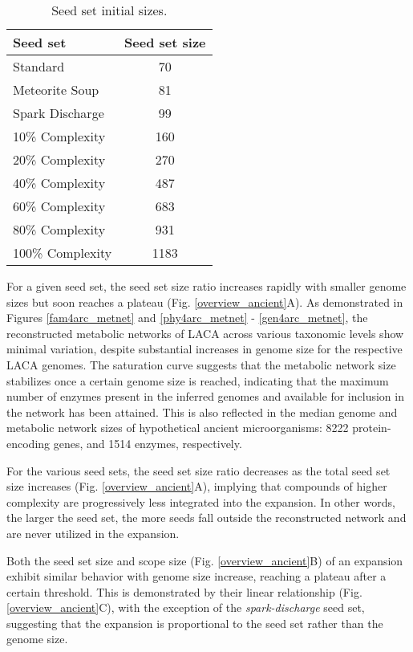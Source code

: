\begin{wraptable}{l}{0.4\textwidth}
    \caption{Seed set initial sizes.}
    \begin{tabular}{lc}

        \textbf{Seed set} & \textbf{Seed set size} \\ \hline\hline
        \addlinespace[0.5ex]
        Standard & 70 \\ 
        Meteorite Soup & 81 \\ 
        Spark Discharge & 99 \\ 
        10\% Complexity & 160 \\ 
        20\% Complexity & 270 \\ 
        40\% Complexity & 487 \\ 
        60\% Complexity & 683 \\ 
        80\% Complexity & 931 \\ 
        100\% Complexity & 1183 \\ 
        \bottomrule
    
    \end{tabular}
    \label{seedset_sizes}
\end{wraptable}

\normalsize
For a given seed set, the seed set size ratio increases rapidly with smaller genome sizes but soon reaches a plateau (Fig. \ref{overview_ancient}A). As demonstrated in Figures \ref{fam4arc_metnet} and \ref{phy4arc_metnet} - \ref{gen4arc_metnet}, the reconstructed metabolic networks of LACA across various taxonomic levels show minimal variation, despite substantial increases in genome size for the respective LACA genomes. The saturation curve suggests that the metabolic network size stabilizes once a certain genome size is reached, indicating that the maximum number of enzymes present in the inferred genomes and available for inclusion in the network has been attained. This is also reflected in the median genome and metabolic network sizes of hypothetical ancient microorganisms: 8222 protein-encoding genes, and 1514 enzymes, respectively.

For the various seed sets, the seed set size ratio decreases as the total seed set size increases (Fig. \ref{overview_ancient}A), implying that compounds of higher complexity are progressively less integrated into the expansion. In other words, the larger the seed set, the more seeds fall outside the reconstructed network and are never utilized in the expansion.

Both the seed set size and scope size (Fig. \ref{overview_ancient}B) of an expansion exhibit similar behavior with genome size increase, reaching a plateau after a certain threshold. This is demonstrated by their linear relationship (Fig. \ref{overview_ancient}C), with the exception of the \textit{spark-discharge} seed set, suggesting that the expansion is proportional to the seed set rather than the genome size.

